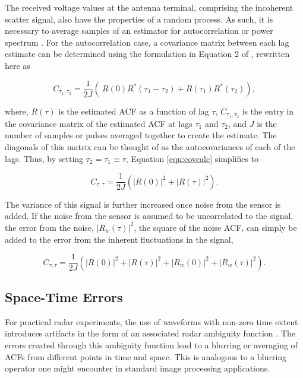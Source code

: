 \documentclass[draft,ras]{agutex}
\begin{document}
\begin{article}
The received voltage values at the antenna terminal, comprising the incoherent scatter signal, also have the properties of a random process. As such, it is necessary to average samples of an estimator for autocorrelation or power spectrum \citep{Diaz:2008co}.  For the autocorrelation case, a covariance matrix between each lag estimate can be determined using the formulation in Equation 2 of \citet{hysell2008}, rewritten here as

\begin{equation}
\label{eqn:covcalc}
C_{\tau_1,\tau_2} = \frac{1}{2J} \left( \ R(0)  R^*(\tau_1-\tau_2) +  R(\tau_1) R^*(\tau_2) \right),
\end{equation}

\noindent where, $R(\tau)$ is the estimated ACF as a function of lag $\tau$, $C_{\tau_1,\tau_2}$ is the entry in the covariance matrix of the estimated ACF at lags $\tau_1$ and $\tau_2$,  and $J$ is the number of samples or pulses averaged together to create the estimate. The diagonals of this matrix can be thought of as the autocovariances of each of the lags.  Thus, by setting $\tau_2 = \tau_1 \equiv \tau$, Equation \ref{eqn:covcalc} simplifies to

\begin{equation}
\label{eqn:covdiag}
C_{\tau,\tau} = \frac{1}{2J} \left(  |R(0)|^2 +|R(\tau)|^2\right).
\end{equation}

The variance of this signal is further increased once noise from the sensor is added.  If the noise from the sensor is assumed to be uncorrelated to the signal, the error from the noise, $\left|R_w (\tau)\right|^2$, the square of the noise ACF, can simply be added to the error from the inherent fluctuations in the signal,


\begin{equation}
\label{eqn:covdiagwn}
C_{\tau,\tau} = \frac{1}{2J} \left(  |R(0)|^2 +|R(\tau)|^2 + \left|R_w (0)\right|^2+\left|R_w (\tau)\right|^2\right).
\end{equation}

\subsection{Space-Time Errors}

For practical radar experiments, the use of waveforms with non-zero time extent introduces artifacts in the form of an associated radar ambiguity function \citep{nygren1996}.  The errors created through this ambiguity function lead to a blurring or averaging of ACFs from different points in time and space. This is analogous to a blurring operator one might encounter in standard image processing applications.
 

\end{article}
\end{document}

